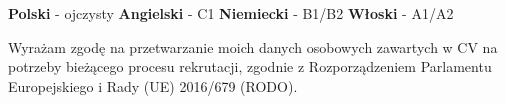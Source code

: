 \documentclass[11pt,a4paper]{awesome-cv}
\renewcommand{\acvSectionContentTopSkip}{1.6mm}
\renewenvironment{cvparagraph}{%
  \vspace{\acvSectionContentTopSkip}\vspace{-1mm}
  \paragraphstyle
}{\par\vspace{2mm}}
\begin{document}

\begin{cvparagraph}
\textbf{Polski} - ojczysty \qquad \textbf{Angielski} - C1 \qquad \textbf{Niemiecki} - B1/B2 \qquad \textbf{Włoski} - A1/A2
\end{cvparagraph}

\vspace{2mm}
{\fontsize{8pt}{9pt}\selectfont\color{graytext}
\noindent Wyrażam zgodę na przetwarzanie moich danych osobowych zawartych w CV na potrzeby bieżącego procesu rekrutacji, zgodnie z Rozporządzeniem Parlamentu Europejskiego i Rady (UE) 2016/679 (RODO).\par}
\end{document}
